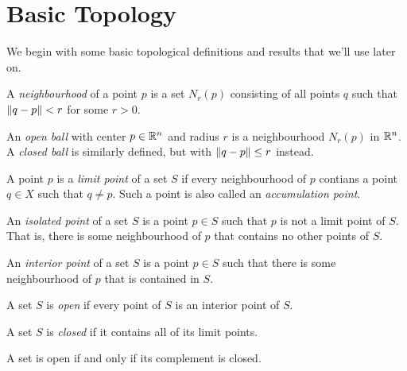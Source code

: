 \documentclass{article}
\begin{document}
\section{Basic Topology}

We begin with some basic topological definitions and results that we'll use later on.

\begin{definition}[Neighbourhood]
  A \emph{neighbourhood} of a point $p$ is a set $N_r(p)$ consisting of all points $q$ such that $\norm{q - p} < r$ for some $r > 0$.
\end{definition}
An \emph{open ball} with center $p \in \mathbb{R}^n$ and radius $r$ is a neighbourhood $N_r(p)$ in $\mathbb{R}^n$.
A \emph{closed ball} is similarly defined, but with $\norm{q - p} \leq r$ instead.

\begin{definition}
  A point $p$ is a \emph{limit point} of a set $S$ if every neighbourhood of $p$ contians a point $q \in X$ such that $q \neq p$.
  Such a point is also called an \emph{accumulation point}.
\end{definition}

\begin{definition}
  An \emph{isolated point} of a set $S$ is a point $p \in S$ such that $p$ is not a limit point of $S$.
  That is, there is some neighbourhood of $p$ that contains no other points of $S$.
\end{definition}

\begin{definition}
  An \emph{interior point} of a set $S$ is a point $p \in S$ such that there is some neighbourhood of $p$ that is contained in $S$.
\end{definition}

\begin{definition}
  A set $S$ is \emph{open} if every point of $S$ is an interior point of $S$.
\end{definition}

\begin{definition}
  A set $S$ is \emph{closed} if it contains all of its limit points.
\end{definition}

\begin{theorem}
  A set is open if and only if its complement is closed.
\end{theorem}
\end{document}
